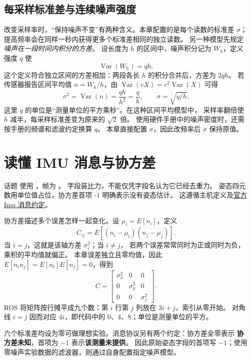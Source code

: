 \subsection{每采样标准差与连续噪声强度}
改变采样率时，“保持噪声不变”有两种含义。本章配置的是每个读数的标准差 $\sigma$；
提高频率会在同样一秒内获得更多个标准差相同的独立读数。
另一种模型先规定\emph{噪声在一段时间内积分的方差}。
设长度为 $h$ 的区间中，噪声积分记为 $W_h$，定义强度 $q$ 使
\[
\operatorname{Var}(W_h)=qh.
\]
这个定义符合独立区间的方差相加：两段各长 $h$ 的积分合并后，方差为 $2qh$。
若传感器报告区间平均值 $n=W_h/h$，由
$\operatorname{Var}(cX)=c^2\operatorname{Var}(X)$ 可得
\begin{equation}
\sigma^2=\operatorname{Var}(n)=\frac{qh}{h^2}=\frac qh,
\qquad \sigma=\sqrt{q/h}.
\end{equation}
这里 $q$ 的单位是“测量单位的平方乘秒”。在这种区间平均模型中，
采样率翻倍使 $h$ 减半，每采样标准差变为原来的 $\sqrt2$ 倍。
使用硬件手册中的噪声密度时，还需按手册的频谱和滤波约定换算 $q$。
本章直接配置 $\sigma$，因此改频率后 $\sigma$ 保持原值。

\section{读懂 IMU 消息与协方差}
话题  使用 ，帧为 。
 字段装比力，不能仅凭字段名认为它已经去重力。
姿态四元数用单位值占位，协方差首项 -1 明确表示没有姿态估计。
这遵循主机定义及\href{https://github.com/ros2/common_interfaces/blob/rolling/sensor_msgs/msg/Imu.msg}{官方 Imu 消息约定}。

协方差描述多个误差怎样一起变化。设 $\mu_i=E[n_i]$，定义
\begin{equation}
C_{ij}=E[(n_i-\mu_i)(n_j-\mu_j)].
\end{equation}
当 $i=j$，这就是该轴方差 $\sigma_i^2$；当 $i\ne j$，
若两个误差常常同时为正或同时为负，乘积的平均值就偏正。
本章误差独立且零均值，因此 $E[n_i n_j]=E[n_i]E[n_j]=0$，得到
\[
C=\begin{bmatrix}\sigma_x^2&0&0\\0&\sigma_y^2&0\\0&0&\sigma_z^2\end{bmatrix}.
\]
ROS 将矩阵按行摊平成九个数：第 $i$ 行第 $j$ 列放在 $3i+j$，索引从零开始。
对角线 $i=j$ 因而对应 $4i$，即代码中的 0、4、8；单位是测量单位的平方。

六个标准差均设为零可做理想实验。消息协议另有两个约定：协方差全零表示
\textbf{协方差未知}，首项为 $-1$ 表示\textbf{该测量未提供}。
因此原始姿态字段的首项写 $-1$；使用零噪声实验数据的滤波器，则通过自身配置指定噪声模型。

